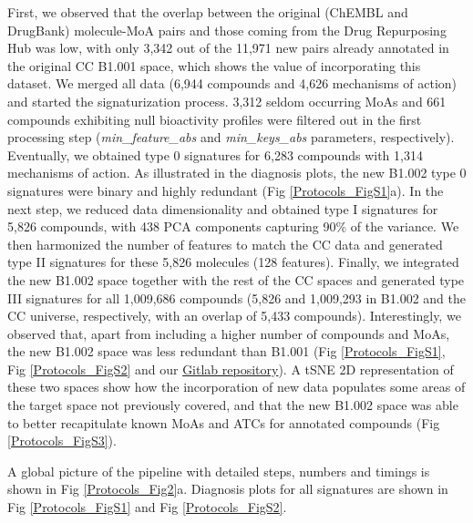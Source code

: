 First, we observed that the overlap between the original (ChEMBL and DrugBank) molecule-MoA pairs and those coming from the Drug Repurposing Hub was low, with only 3,342 out of the 11,971 new pairs already annotated in the original CC B1.001 space, which shows the value of incorporating this dataset. We merged all data (6,944 compounds and 4,626 mechanisms of action) and started the signaturization process. 3,312 seldom occurring MoAs and 661 compounds exhibiting null bioactivity profiles were filtered out in the first processing step (\textit{min\_feature\_abs} and \textit{min\_keys\_abs} parameters, respectively). Eventually, we obtained type 0 signatures for 6,283 compounds with 1,314 mechanisms of action. As illustrated in the diagnosis plots, the new B1.002 type 0 signatures were binary and highly redundant (Fig \ref{Protocols_FigS1}a). In the next step, we reduced data dimensionality and obtained type I signatures for 5,826 compounds, with 438 PCA components capturing 90\% of the variance. We then harmonized the number of features to match the CC data and generated type II signatures for these 5,826 molecules (128 features). Finally, we integrated the new B1.002 space together with the rest of the CC spaces and generated type III signatures for all 1,009,686 compounds (5,826 and 1,009,293 in B1.002 and the CC universe, respectively, with an overlap of 5,433 compounds). Interestingly, we observed that, apart from including a higher number of compounds and MoAs, the new B1.002 space was less redundant than B1.001 (Fig \ref{Protocols_FigS1}, Fig \ref{Protocols_FigS2} and our \href{https://gitlabsbnb.irbbarcelona.org/packages/protocols}{Gitlab repository}). A tSNE 2D representation of these two spaces show how the incorporation of new data populates some areas of the target space not previously covered, and that the new B1.002 space was able to better recapitulate known MoAs and ATCs for annotated compounds (Fig \ref{Protocols_FigS3}). 

A global picture of the pipeline with detailed steps, numbers and timings is shown in Fig \ref{Protocols_Fig2}a. Diagnosis plots for all signatures are shown in Fig \ref{Protocols_FigS1} and Fig \ref{Protocols_FigS2}. 



